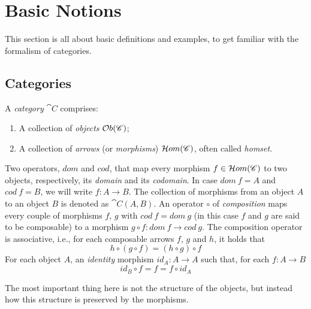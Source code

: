 
\section{Basic Notions}\label{sect:basic_nots}


This section is all about basic definitions and examples, to get familiar with the formalism of categories.

\subsection{Categories}\label{ssect:cats}

\begin{definition}[Category]\label{def:category}
    A \emph{category} $\cat{C}$ comprises:
    \begin{enumerate}
        \item A collection of \emph{objects} $\mathcal{O}b(\mathscr{C})$;
        \item A collection of \emph{arrows} (or \emph{morphisms}) $\mathcal{H}om(\mathscr{C})$, often called \emph{homset}.
    \end{enumerate}
    Two operators, $dom$ and $cod$, that map every morphism \-$f \in \mathcal{H}om(\mathscr{C})$ to two objects, respectively, its \emph{domain} and its \emph{codomain}. In case $dom\ f = A$ and $cod\ f = B$, we will write $f: A \rightarrow B$. The collection of morphisms from an object $A$ to an object $B$ is denoted as $\cat{C}(A, B)$.
    An operator $\circ$ of \emph{composition} maps every couple of morphisms $f$, $g$ with $cod\ f = dom \ g$ (in this case $f$ and $g$ are said to be composable) to a morphism $g \circ f : dom\ f \rightarrow cod \ g$. The composition operator is associative, i.e., for each composable arrows $f$, $g$ and $h$, it holds that
    $$
        h \circ (g \circ f) = (h\circ g) \circ f
    $$
    For each object $A$, an \emph{identity} morphism $id_A : A \rightarrow A$ such that, for each $f: A \rightarrow B$
    \[
        id_B \circ f = f = f \circ id_A 
    \]
\end{definition}

The most important thing here is not the structure of the objects, but instead how this structure is preserved by the morphisms.


